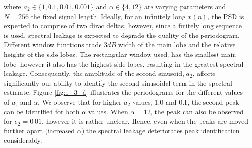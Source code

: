 \begin{enumerate}[label=\alph*), leftmargin=*]
where $a_{2} \in \{1, 0.1, 0.01, 0.001\}$ and $\alpha \in \{4, 12\}$ are varying parameters and $N=256$ the fixed signal length. Ideally, for an infinitely long $x(n)$,
the PSD is expected to comprise of two dirac deltas, however, since a finitely long sequence is used, spectral leakage is expected to degrade the quality of the periodogram.
Different window functions trade $3dB$ width of the main lobe and the relative heights of the side lobes. The rectangular window used, has the smallest main lobe,
however it also has the highest side lobes, resulting in the greatest spectral leakage. Consequently, the amplitude of the second sinusoid, $a_{2}$, affects significantly our
ability to identify the second sinusoidal term in the spectral estimate. Figure \ref{fig:1_3_d} illustrates the periodograms for the different values of $a_{2}$ and $\alpha$.
We observe that for higher $a_{2}$ values, $1.0$ and $0.1$, the second peak can be identified for both $\alpha$ values. When $\alpha=12$, the peak can also be observed for
$a_{2}=0.01$, however it is rather unclear. Hence, even when the peaks are moved further apart (increased $\alpha$) the spectral leakage deteriorates peak identification
considerably.


\end{enumerate}
